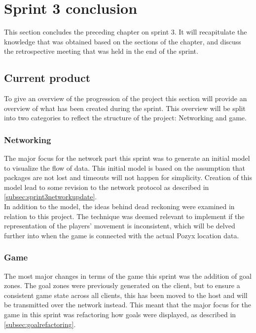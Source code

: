 \section{Sprint 3 conclusion}\label{sec:sprint3conclusion}
This section concludes the preceding chapter on sprint 3.
It will recapitulate the knowledge that was obtained based on the sections of the chapter, and discuss the retrospective meeting that was held in the end of the sprint.

\subsection{Current product}
To give an overview of the progression of the project this section will provide an overview of what has been created during the sprint.
This overview will be split into two categories to reflect the structure of the project: Networking and game.

\subsubsection{Networking}
The major focus for the network part this sprint was to generate an initial \uppaal model to visualize the flow of data.
This initial model is based on the assumption that packages are not lost and timeouts will not happen for simplicity.
Creation of this model lead to some revision to the network protocol as described in \autoref{subsec:sprint3networkupdate}.\\
In addition to the \uppaal model, the ideas behind dead reckoning were examined in relation to this project.
The technique was deemed relevant to implement if the representation of the players' movement is inconsistent, which will be delved further into when the game is connected with the actual Pozyx location data.

\subsubsection{Game}
The most major changes in terms of the game this sprint was the addition of goal zones.
The goal zones were previously generated on the client, but to ensure a consistent game state across all clients, this has been moved to the host and will be transmitted over the network instead.
This meant that the major focus for the game in this sprint was refactoring how goals were displayed, as described in \autoref{subsec:goalrefactoring}.

